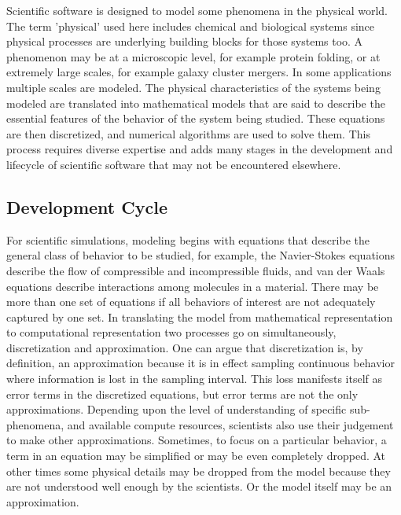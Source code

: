 \label{sec:lifecycle} 
Scientific software is designed to model some phenomena in the
physical world. The term 'physical' used here includes chemical and
biological systems since physical processes are underlying building
blocks for those systems too. A phenomenon may be at a microscopic level, for example
protein folding, or at extremely large scales, for example galaxy cluster
mergers.  In some applications multiple scales are modeled.  The physical characteristics of the systems being modeled are
translated into mathematical models that are said to describe the
essential features of the behavior of the system being
studied. These equations are then discretized, and numerical algorithms
are used to solve them. This process requires diverse expertise and
adds many stages in the development and lifecycle of scientific
software that may not be encountered elsewhere. 


\subsection{Development Cycle}
\label{sec:dev-cycle}
For scientific simulations, modeling begins with equations that describe the
general class of behavior to be studied, for example, the Navier-Stokes
equations describe the flow of compressible and incompressible
fluids, and van der Waals equations describe interactions among
molecules in a material. There may be more than one set of equations
if all behaviors of interest are not adequately captured by one set.
In translating the model from mathematical representation to
computational representation two processes go on simultaneously,
discretization and approximation. One can argue that discretization is,
by definition, an approximation because it is in effect sampling
continuous behavior where information is lost in the sampling
interval. This loss manifests itself as error terms in the discretized
equations, but error terms are not the only
approximations. Depending upon the level of understanding of specific
sub-phenomena, and available compute resources, scientists also 
use their judgement to make other approximations. Sometimes, to focus on a
particular behavior, a term in an equation may be simplified or may be even completely
dropped. At other times some physical details may be dropped
from the model because they are not understood well enough by the
scientists.  Or the model itself may be an approximation.  

